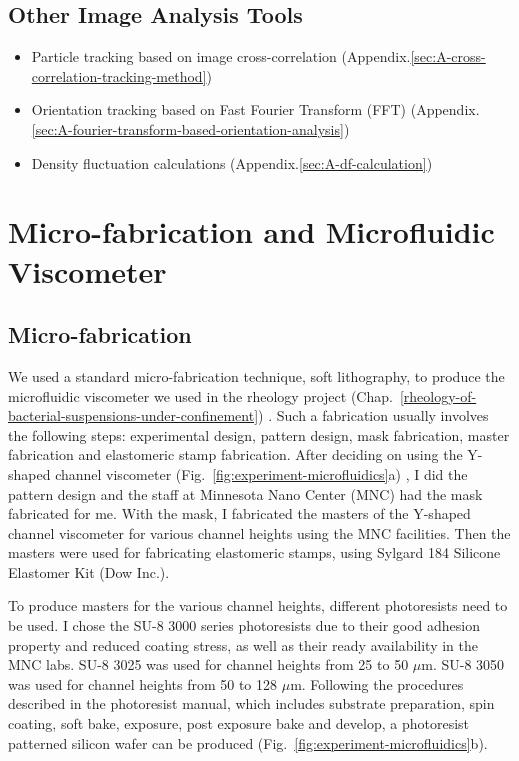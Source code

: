 \subsection{Other Image Analysis Tools}

\begin{itemize}
	\item Particle tracking based on image cross-correlation (Appendix.\ref{sec:A-cross-correlation-tracking-method})
	\item Orientation tracking based on Fast Fourier Transform (FFT) (Appendix.\ref{sec:A-fourier-transform-based-orientation-analysis})
	\item Density fluctuation calculations (Appendix.\ref{sec:A-df-calculation})
\end{itemize}


\section{Micro-fabrication and Microfluidic Viscometer}
\label{micro-fabrication-and-microfluidics}

\subsection{Micro-fabrication}

We used a standard micro-fabrication technique, soft lithography, to produce the microfluidic viscometer we used in the rheology project (Chap.~\ref{rheology-of-bacterial-suspensions-under-confinement}) \cite{Qin2010}. Such a fabrication usually involves the following steps: experimental design, pattern design, mask fabrication, master fabrication and elastomeric stamp fabrication.
After deciding on using the Y-shaped channel viscometer (Fig.~\ref{fig:experiment-microfluidics}a) \cite{Gachelin2013}, I did the pattern design and the staff at Minnesota Nano Center (MNC) had the mask fabricated for me. With the mask, I fabricated the masters of the Y-shaped channel viscometer for various channel heights using the MNC facilities. Then the masters were used for fabricating elastomeric stamps, using Sylgard 184 Silicone Elastomer Kit (Dow Inc.).

To produce masters for the various channel heights, different photoresists need to be used. I chose the SU-8 3000 series photoresists due to their good adhesion property and reduced coating stress, as well as their ready availability in the MNC labs. SU-8 3025 was used for channel heights from 25 to 50 $\mu$m. SU-8 3050 was used for channel heights from 50 to 128 $\mu$m. Following the procedures described in the photoresist manual, which includes substrate preparation, spin coating, soft bake, exposure, post exposure bake and develop, a photoresist patterned silicon wafer can be produced (Fig.~\ref{fig:experiment-microfluidics}b).

